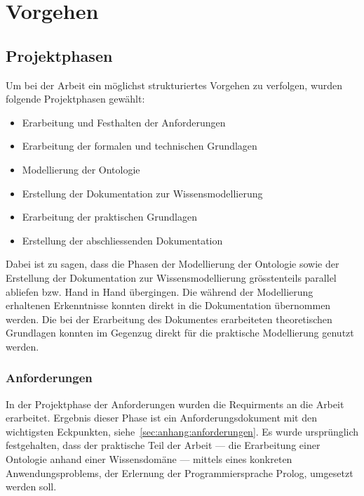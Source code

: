 \chapter{Vorgehen}
\label{chap:vorgehen}

\section{Projektphasen}
\label{sec:projektphasen}

Um bei der Arbeit ein möglichst strukturiertes Vorgehen zu verfolgen, wurden folgende Projektphasen gewählt:
\begin{itemize}
\item Erarbeitung und Festhalten der Anforderungen
\item Erarbeitung der formalen und technischen Grundlagen
\item Modellierung der Ontologie
\item Erstellung der Dokumentation zur Wissensmodellierung
\item Erarbeitung der praktischen Grundlagen
\item Erstellung der abschliessenden Dokumentation
\end{itemize}

Dabei ist zu sagen, dass die Phasen der Modellierung der Ontologie sowie der Erstellung der Dokumentation zur Wissensmodellierung grösstenteils parallel abliefen bzw. Hand in Hand übergingen. Die während der Modellierung erhaltenen Erkenntnisse konnten direkt in die Dokumentation übernommen werden. Die bei der Erarbeitung des Dokumentes erarbeiteten theoretischen Grundlagen konnten im Gegenzug direkt für die praktische Modellierung genutzt werden.

\subsection{Anforderungen}
\label{subsec:anforderungen}
In der Projektphase der Anforderungen wurden die Requirments an die Arbeit erarbeitet. Ergebnis dieser Phase ist ein Anforderungsdokument mit den wichtigsten Eckpunkten, siehe~\autoref{sec:anhang:anforderungen}. Es wurde ursprünglich festgehalten, dass der praktische Teil der Arbeit --- die Erarbeitung einer Ontologie anhand einer Wissensdomäne --- mittels eines konkreten Anwendungsproblems, der Erlernung der Programmiersprache Prolog, umgesetzt werden soll. 

